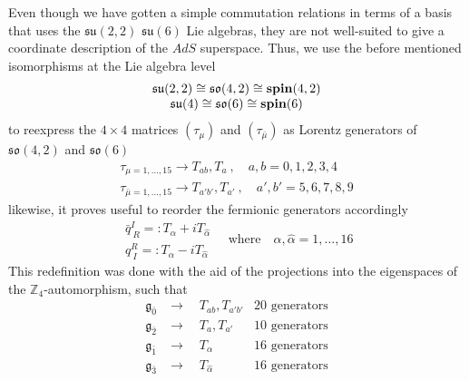 \documentclass[a4paper,12pt]{article}
\numberwithin{equation}{section}
\numberwithin{thm}{section}
\numberwithin{exm}{section}
\newcommand{\lra}{\longrightarrow}
\newcommand{\Z}{{\mathbb Z}}
\newcommand{\<}{{\langle}}
\renewcommand{\>}{{\rangle}}
\newcommand{\mf}{\mathfrak}
\renewcommand{\a}{{\alpha}}
\newcommand{\ah}{{\widehat\alpha}}
\renewcommand{\b}{{\beta}}
\renewcommand{\d}{{\delta}}
\newcommand{\m}{{\mu}}
\newcommand{\n}{{\nu}}
\renewcommand{\r}{{\rho}}
\newcommand{\s}{{\sigma}}
\begin{document}
Even though we have gotten a simple commutation relations in terms of a basis that uses the $\mf{su}(2,2)$ $\mf{su}(6)$ Lie algebras, they are not well-suited to give a coordinate description of the $AdS$ superspace. Thus, we use the before mentioned isomorphisms at the Lie algebra level
	\begin{equation}
		\begin{array}{c}
		\mf{su}(2,2) \cong \mf{so}(4,2) \cong {\bf spin}(4,2) \\
		\mf{su}(4) \cong \mf{so}(6) \cong {\bf spin}(6)
		\end{array}
	\end{equation}
to reexpress the $4\times 4$ matrices $(\tau_\m)$ and $(\tau_{\bar\m})$ as Lorentz generators of $\mf{so}(4,2)$ and $\mf{so}(6)$
	\begin{equation}
		\begin{array}{c}
		\tau_{\m=1,\ldots,15}\lra T_{ab}, T_a\ ,\quad a,b=0,1,2,3,4 \\
		\tau_{\bar\m=1,\ldots, 15}\lra T_{a'b'},T_{a'}\ ,\quad a',b'=5,6,7,8,9
		\end{array}
	\end{equation}
%
likewise, it proves useful to reorder the fermionic generators accordingly \cite{Mazzucato2012}
	\begin{equation}
		\begin{array}{c}
		\bar q^I_{\ R} =: T_\a + i T_\ah \\
		q^R_{\ I} =: T_\a - i T_\ah
		\end{array}\quad\text{where}\quad \a,\ah=1,\ldots,16
	\end{equation}
This redefinition was done with the aid of the projections into the eigenspaces of the $\Z_4$-automorphism, such that
	\begin{equation}
		\begin{array}{lll}
		\mf g_{\bar 0} & \lra\quad T_{ab},T_{a'b'} & 20\text{ generators}\\
		\mf g_{\bar 2} & \lra\quad T_a, T_{a'} & 10\text{ generators} \\
		\mf g_{\bar 1} & \lra\quad T_\a & 16\text{ generators}\\
		\mf g_{\bar 3} & \lra\quad T_\ah & 16\text{ generators}
		\end{array}
	\end{equation}
\end{document}

